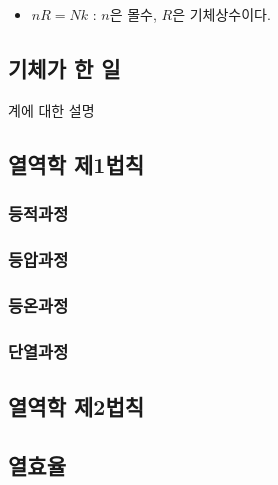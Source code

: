 \begin{flushleft}
\begin{defn}
  \begin{itemize}
    \item  $nR=Nk$ : $n$은 몰수, $R$은 기체상수이다.
  \end{itemize}  
  \end{defn}



     \subsection{기체가 한 일}
     계에 대한 설명 

     \subsection{열역학 제1법칙}
         \subsubsection*{등적과정}
        \subsubsection*{등압과정}
        \subsubsection*{등온과정}
        \subsubsection*{단열과정}
     \subsection{열역학 제2법칙}
     \subsection{열효율}



\end{flushleft}